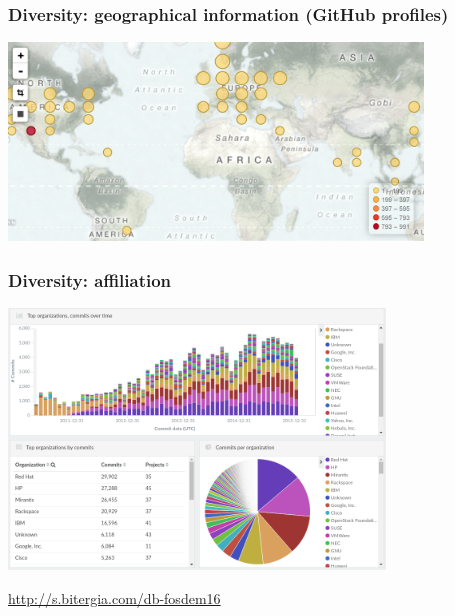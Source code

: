 \documentclass[17pt,aspectratio=169,hyperref=pdfusetitle]{beamer}
\begin{document}

\begin{frame}
\frametitle{Diversity: geographical information (GitHub profiles)}

\begin{center}
  \includegraphics[width=11cm]{figs/map-commits-elasticsearch}
\end{center}

\end{frame}


\begin{frame}
\frametitle{Diversity: affiliation}

\begin{center}
  \includegraphics[width=10cm]{figs/organizations-openstack}

\end{center}

\begin{flushright}
  \url{http://s.bitergia.com/db-fosdem16}
\end{flushright}


\end{frame}
\end{document}
